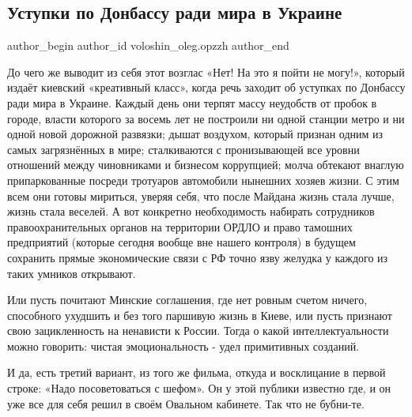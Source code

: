  
 
 
 
 
 
\subsection{Уступки по Донбассу ради мира в Украине}
\label{sec:10_12_2021.fb.voloshin_oleg.opzzh.1.ustupki}
 
\ifcmt
 author_begin
   author_id voloshin_oleg.opzzh
 author_end
\fi

До чего же выводит из себя этот возглас «Нет! На это я пойти не могу!», который
издаёт киевский «креативный класс», когда речь заходит об уступках по Донбассу
ради мира в Украине. Каждый день они терпят массу неудобств от пробок в городе,
власти которого за восемь лет не построили ни одной станции метро и ни одной
новой дорожной развязки; дышат воздухом, который признан одним из самых
загрязнённых в мире; сталкиваются с пронизывающей все уровни отношений между
чиновниками и бизнесом коррупцией; молча обтекают внаглую припаркованные
посреди тротуаров автомобили нынешних хозяев жизни. С этим всем они готовы
мириться, уверяя себя, что после Майдана жизнь стала лучше, жизнь стала
веселей. А вот конкретно необходимость набирать сотрудников правоохранительных
органов на территории ОРДЛО и право тамошних предприятий (которые сегодня
вообще вне нашего контроля) в будущем сохранить прямые экономические связи с РФ
точно  язву желудка у каждого из таких умников открывают. 

Или пусть почитают Минские соглашения, где нет ровным счетом ничего, способного
ухудшить и без того паршивую жизнь в Киеве, или пусть признают свою
зацикленность на ненависти к России. Тогда о какой интеллектуальности можно
говорить: чистая эмоциональность - удел примитивных созданий. 

И да, есть третий вариант, из того же фильма, откуда и восклицание в первой
строке: «Надо посоветоваться с шефом». Он у этой публики известно где, и он уже
все для себя решил в своём Овальном кабинете. Так что не бубни-те.

